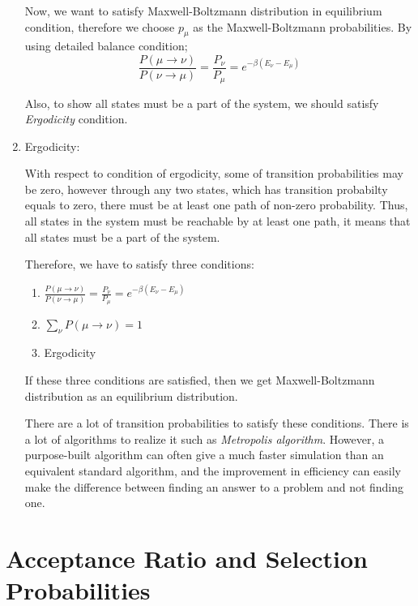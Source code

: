 \documentclass[12pt,fleqn]{report}
\begin{document}
\begin{enumerate}
Now, we want to satisfy Maxwell-Boltzmann distribution in equilibrium condition, therefore we choose $p_\mu$ as the Maxwell-Boltzmann probabilities. By using detailed balance condition;
\begin{equation}
\frac{P(\mu \rightarrow \nu)}{P(\nu \rightarrow \mu)} = \frac{P_\nu }{P_\mu } = e^ {-\beta (E_\nu - E_\mu)}
\end{equation}


Also, to show all states must be a part of the system, we should satisfy \textit{Ergodicity} condition.

\item Ergodicity:

With respect to condition of ergodicity, some of transition probabilities may be zero, however through any two states, which has transition probabilty equals to zero, there must be at least one path of non-zero probability. Thus, all states in the system must be reachable by at least one path, it means that all states must be a part of the system.

Therefore, we have to satisfy three conditions:
\begin{enumerate}
\item $\frac{P(\mu \rightarrow \nu)}{P(\nu \rightarrow \mu)} = \frac{P_\nu }{P_\mu } = e^ {-\beta (E_\nu - E_\mu)}$
\item $\sum\limits_{\nu} P(\mu \rightarrow \nu )  =1 $
\item Ergodicity

\end{enumerate}


If these three conditions are satisfied, then we get Maxwell-Boltzmann distribution as an equilibrium distribution.

There are a lot of transition probabilities to satisfy these conditions. There is a lot of algorithms to realize it such as \textit{Metropolis algorithm}. However, a purpose-built algorithm can often give a much faster simulation than an equivalent standard algorithm, and the improvement in efficiency can easily make the difference between finding an answer to a problem and not finding one. \cite[p. 40]{newman}

\end{enumerate}


\section{Acceptance Ratio and Selection Probabilities} 
\end{document}
